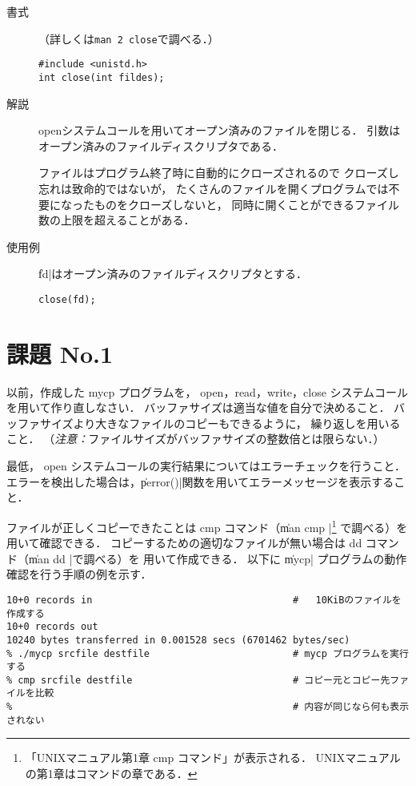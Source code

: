 \begin{description}
\item[書式]（詳しくは\texttt{man 2 close}で調べる．）

\begin{lstlisting}[numbers=none]
#include <unistd.h>
int close(int fildes);
\end{lstlisting}

\item[解説]
openシステムコールを用いてオープン済みのファイルを閉じる．
引数はオープン済みのファイルディスクリプタである．

ファイルはプログラム終了時に自動的にクローズされるので
クローズし忘れは致命的ではないが，
たくさんのファイルを開くプログラムでは不要になったものをクローズしないと，
同時に開くことができるファイル数の上限を超えることがある．

\item[使用例]
\|fd|はオープン済みのファイルディスクリプタとする．

\begin{lstlisting}[numbers=none]
close(fd);
\end{lstlisting}
\end{description}

\section*{課題 No.1}
以前，作成した mycp プログラムを，
open，read，write，close システムコールを用いて作り直しなさい．
バッファサイズは適当な値を自分で決めること．
バッファサイズより大きなファイルのコピーもできるように，
繰り返しを用いること．
（\emph{注意：}ファイルサイズがバッファサイズの整数倍とは限らない．）

最低，
open システムコールの実行結果についてはエラーチェックを行うこと．
エラーを検出した場合は，\|perror()|関数を用いてエラーメッセージを表示すること．

ファイルが正しくコピーできたことは cmp コマンド（\| man cmp |\footnote{
「UNIXマニュアル第1章 cmp コマンド」が表示される．
UNIXマニュアルの第1章はコマンドの章である．} で調べる）を
用いて確認できる．
コピーするための適切なファイルが無い場合は dd コマンド（\| man dd |で調べる）を
用いて作成できる．
以下に \|mycp| プログラムの動作確認を行う手順の例を示す．

\begin{lstlisting}[numbers=none]
% dd if=/dev/urandom of=srcfile bs=1024 count=10  # ランダムな内容の
10+0 records in                                   #   10KiBのファイルを作成する
10+0 records out
10240 bytes transferred in 0.001528 secs (6701462 bytes/sec)
% ./mycp srcfile destfile                         # mycp プログラムを実行する
% cmp srcfile destfile                            # コピー元とコピー先ファイルを比較
%                                                 # 内容が同じなら何も表示されない
\end{lstlisting}

